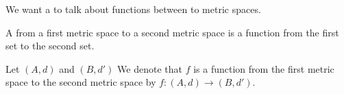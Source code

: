 
\sbasic




\sstart



We want a to talk about functions
between to metric spaces.


A 
from a first metric space to a second
metric space is a function from
the first set to the second set.


Let $(A, d)$ and $(B, d')$
We denote that $f$ is a function
from the first metric space to
the second metric space by
$f: (A, d) \to (B, d')$.

\strats

